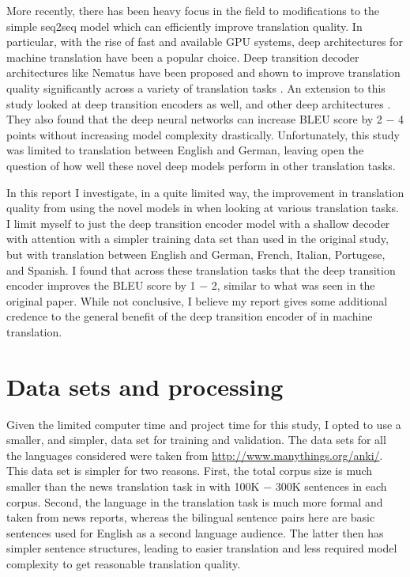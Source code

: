 \documentclass[twocolumn,superscriptaddress]{revtex4-1}
\begin{document}
More recently, there has been heavy focus in the field to modifications to the simple seq2seq model which can efficiently improve translation quality.
In particular, with the rise of fast and available GPU systems, deep architectures for machine translation have been a popular choice.
Deep transition decoder architectures like Nematus have been proposed and shown to improve translation quality significantly across a variety of translation tasks \cite{sennrich-etal-2017-university}.
An extension to this study looked at deep transition encoders as well, and other deep architectures \cite{miceli-barone-etal-2017-deep}.
They also found that the deep neural networks can increase BLEU score by 2 $-$ 4 points without increasing model complexity drastically.
Unfortunately, this study was limited to translation between English and German, leaving open the question of how well these novel deep models perform in other translation tasks.

In this report I investigate, in a quite limited way, the improvement in translation quality from using the novel models in \cite{miceli-barone-etal-2017-deep} when looking at various translation tasks.
I limit myself to just the deep transition encoder model with a shallow decoder with attention with a simpler training data set than used in the original study, but with translation between English and German, French, Italian, Portugese, and Spanish.
I found that across these translation tasks that the deep transition encoder improves the BLEU score by 1 $-$ 2, similar to  what was seen in the original paper.
While not conclusive, I believe my report gives some additional credence to the general benefit of the deep transition encoder of \cite{miceli-barone-etal-2017-deep} in machine translation.

\section{Data sets and processing}
Given the limited computer time and project time for this study, I opted to use a smaller, and simpler, data set for training and validation. 
The data sets for all the languages considered were taken from \url{http://www.manythings.org/anki/}.
This data set is simpler for two reasons.
First, the total corpus size is much smaller than the news translation task in \cite{miceli-barone-etal-2017-deep} with 100K $-$ 300K sentences in each corpus.
Second, the language in the translation task is much more formal and taken from news reports, whereas the bilingual sentence pairs here are basic sentences used for English as a second language audience.
The latter then has simpler sentence structures, leading to easier translation and less required model complexity to get reasonable translation quality.
\end{document}
